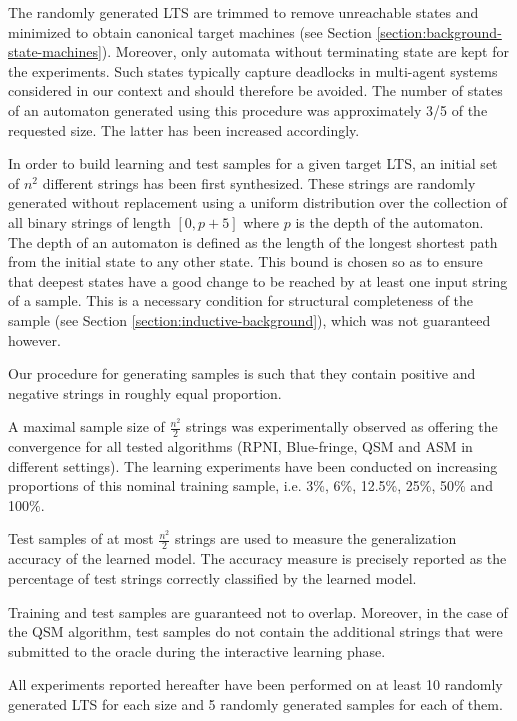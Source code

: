 The randomly generated LTS are trimmed to remove unreachable states and minimized to obtain canonical target machines (see Section \ref{section:background-state-machines}). Moreover, only automata without terminating state are kept for the experiments. Such states typically capture deadlocks in multi-agent systems considered in our context and should therefore be avoided. The number of states of an automaton generated using this procedure was approximately 3/5 of the requested size. The latter has been increased accordingly.

In order to build learning and test samples for a given target LTS, an initial set of $n^2$ different strings has been first synthesized. These strings are randomly generated without replacement using a uniform distribution over the collection of all binary strings of length $[0, p+5]$ where $p$ is the depth of the automaton. The depth of an automaton is defined as the length of the longest shortest path from the initial state to any other state. This bound is chosen so as to ensure that deepest states have a good change to be reached by at least one input string of a sample. This is a necessary condition for structural completeness of the sample (see Section \ref{section:inductive-background}), which was not guaranteed however.

Our procedure for generating samples is such that they contain positive and negative strings in roughly equal proportion.
 
A maximal sample size of $\frac{n^2}{2}$ strings was experimentally observed as offering the convergence for all tested algorithms (RPNI, Blue-fringe, QSM and ASM in different settings). The learning experiments have been conducted on increasing proportions of this nominal training sample, i.e. 3\%, 6\%, 12.5\%, 25\%, 50\% and 100\%.

Test samples of at most $\frac{n^2}{2}$ strings are used to measure the generalization accuracy of the learned model. The accuracy measure is precisely reported as the percentage of test strings correctly classified by the learned model.

Training and test samples are guaranteed not to overlap. Moreover, in the case of the QSM algorithm, test samples do not contain the additional strings that were submitted to the oracle during the interactive learning phase.

All experiments reported hereafter have been performed on at least 10 randomly generated LTS for each size and 5 randomly generated samples for each of them.

